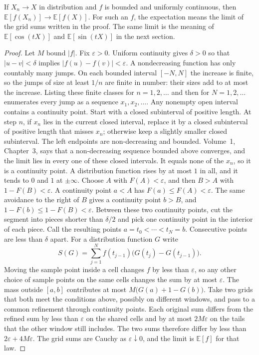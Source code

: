 \begin{proposition}\label{prop:cdf}
If $X_n\to X$ in distribution and $f$ is bounded and uniformly continuous, then $\mathbb E[f(X_n)]\to\mathbb E[f(X)]$. For such an $f$, the expectation means the limit of the grid sums written in the proof. The same limit is the meaning of $\mathbb E[\cos(tX)]$ and $\mathbb E[\sin(tX)]$ in the next section.
\end{proposition}
\begin{proof}
Let $M$ bound $|f|$. Fix $\varepsilon>0$. Uniform continuity gives $\delta>0$ so that $|u-v|<\delta$ implies $|f(u)-f(v)|<\varepsilon$. A nondecreasing function has only countably many jumps. On each bounded interval $[-N,N]$ the increase is finite, so the jumps of size at least $1/n$ are finite in number: their sizes add to at most the increase. Listing these finite classes for $n=1,2,\ldots$ and then for $N=1,2,\ldots$ enumerates every jump as a sequence $x_1,x_2,\ldots$. Any nonempty open interval contains a continuity point. Start with a closed subinterval of positive length. At step $n$, if $x_n$ lies in the current closed interval, replace it by a closed subinterval of positive length that misses $x_n$; otherwise keep a slightly smaller closed subinterval. The left endpoints are non-decreasing and bounded. Volume~1, Chapter~3, says that a non-decreasing sequence bounded above converges, and the limit lies in every one of these closed intervals. It equals none of the $x_n$, so it is a continuity point. A distribution function rises by at most $1$ in all, and it tends to $0$ and $1$ at $\pm\infty$. Choose $A$ with $F(A)<\varepsilon$, and then $B>A$ with $1-F(B)<\varepsilon$. A continuity point $a<A$ has $F(a)\le F(A)<\varepsilon$. The same avoidance to the right of $B$ gives a continuity point $b>B$, and $1-F(b)\le 1-F(B)<\varepsilon$. Between these two continuity points, cut the segment into pieces shorter than $\delta/2$ and pick one continuity point in the interior of each piece. Call the resulting points $a=t_0<\cdots<t_N=b$. Consecutive points are less than $\delta$ apart. For a distribution function $G$ write
\[
 S(G)=\sum_{j=1}^N f(t_{j-1})\bigl(G(t_j)-G(t_{j-1})\bigr).
\]
Moving the sample point inside a cell changes $f$ by less than $\varepsilon$, so any other choice of sample points on the same cells changes the sum by at most $\varepsilon$. The mass outside $[a,b]$ contributes at most $M\bigl(G(a)+1-G(b)\bigr)$. Take two grids that both meet the conditions above, possibly on different windows, and pass to a common refinement through continuity points. Each original sum differs from the refined sum by less than $\varepsilon$ on the shared cells and by at most $2M\varepsilon$ on the tails that the other window still includes. The two sums therefore differ by less than $2\varepsilon+4M\varepsilon$. The grid sums are Cauchy as $\varepsilon\downarrow0$, and the limit is $\mathbb E[f]$ for that law.


\end{proof}
